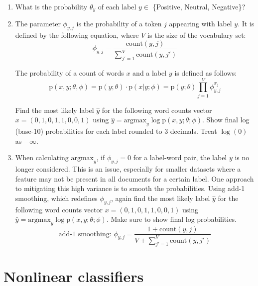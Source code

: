 \documentclass[12pt, letterpaper]{article}
\begin{document}
    \begin{enumerate}[label=\alph*.]
        \item What is the probability $\theta_y$ of each label $y \in$ \{Positive, Neutral, Negative\}?\\

        \item The parameter $\phi_{y, j}$ is the probability of a token $j$ appearing with label $y$. It is defined by the following equation, where $V$ is the size of the vocabulary set:
        $$ \phi_{y, j} = \frac{\text{count}(y, j)}{\sum^V_{j'=1}\text{count}(y, j')}$$
        
        The probability of a count of words $x$ and a label $y$ is defined as follows:
        $$ \mathrm{p}(x, y; \theta, \phi) = \mathrm{p}(y; \theta) \cdot \mathrm{p}(x|y; \phi) = \mathrm{p}(y; \theta)\prod^V_{j=1} \phi^{x_j}_{y, j} $$
        
        Find the most likely label $\hat y$ for the following word counts vector $x = (0,1,0,1,1,0,0,1)$ using $\hat y = \text{argmax}_y \log \mathrm{p}(x, y; \theta; \phi)$. Show final log (base-10) probabilities for each label rounded to 3 decimals. Treat $\log(0)$ as $-\infty$.\\
        
        \item When calculating $\text{argmax}_y$, if $\phi_{y, j} = 0$ for a label-word pair, the label $y$  is no longer considered. This is an issue, especially for smaller datasets where a feature may not be present in all documents for a certain label. One approach to mitigating this high variance is to smooth the probabilities. Using add-1 smoothing, which redefines $\phi_{y, j}$, again find the most likely label $\hat y$ for the following word counts vector $x = (0,1,0,1,1,0,0,1)$ using $\hat y = \text{argmax}_y \log \mathrm{p}(x, y; \theta; \phi)$. Make sure to show final log probabilities.\\
        $$\text{add-1 smoothing: } \phi_{y, j} = \frac{1 + \text{count}(y, j)}{V + \sum^V_{j'=1}\text{count}(y, j')}$$
        
    \end{enumerate}

\section{Nonlinear classifiers}
    
\end{document}
